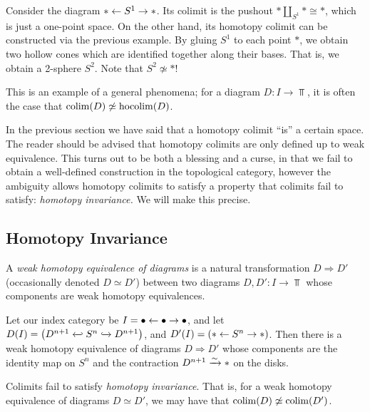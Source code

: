 \begin{example} Consider the diagram $\ast \leftarrow S^1 \to \ast$. Its colimit is the pushout $\ast \amalg_{S^1} \ast \cong \ast$, which is just a one-point space. On the other hand, its homotopy colimit can be constructed via the previous example. By gluing $S^1$ to each point $\ast$, we obtain two hollow cones which are identified together along their bases. That is, we obtain a 2-sphere $S^2$. Note that $S^2 \not \simeq \ast$!
\end{example}

This is an example of a general phenomena; for a diagram $D: I \to \Top$, it is often the case that $\mathop{\operatorname*{colim}}(D) \not\simeq \mathop{\operatorname*{hocolim}}(D)$.


\begin{remark} In the previous section we have said that a homotopy colimit ``is'' a certain space. The reader should be advised that homotopy colimits are only defined up to weak equivalence. This turns out to be both a blessing and a curse, in that we fail to obtain a well-defined construction in the topological category, however the ambiguity allows homotopy colimits to satisfy a property that colimits fail to satisfy: \textit{homotopy invariance.} We will make this precise.
\end{remark}

\subsection{Homotopy Invariance}

\begin{definition} A \textit{weak homotopy equivalence of diagrams} is a natural transformation $D \Rightarrow D'$ (occasionally denoted $D \simeq D'$) between two diagrams $D,D' : I \to \Top$ whose components are weak homotopy equivalences.
\end{definition}

\begin{example}\label{ex:we-of-diagrams} Let our index category be $I = \bullet \leftarrow \bullet \to \bullet$, and let $D(I) = \left(D^{n+1} \hookfrom S^n \hookto D^{n+1}\right)$, and $D'(I) = \left(\ast \leftarrow S^n \to \ast \right)$. Then there is a weak homotopy equivalence of diagrams $D \Rightarrow D'$ whose components are the identity map on $S^n$ and the contraction $D^{n+1} \xrightarrow{\sim} \ast$ on the disks.
\end{example}

\begin{remark} Colimits fail to satisfy \textit{homotopy invariance}. That is, for a weak homotopy equivalence of diagrams $D\simeq D'$, we may have that $\mathop{\operatorname*{colim}}(D) \not\simeq \mathop{\operatorname*{colim}}(D')$.
\end{remark}

